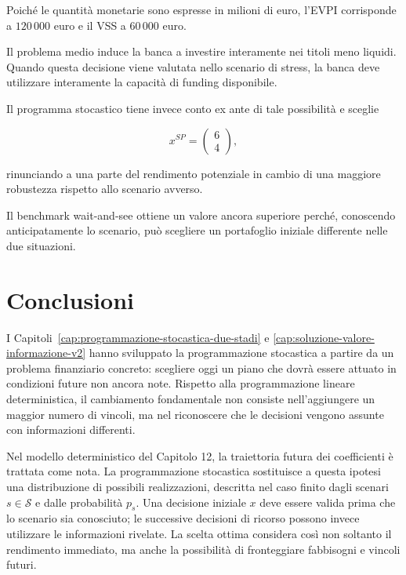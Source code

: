 \begin{enumerate}
Poich\'e le quantit\`a monetarie
sono espresse in milioni di euro,
l'EVPI corrisponde a $120\,000$ euro
e il VSS a $60\,000$ euro.

Il problema medio induce la banca
a investire interamente nei titoli
meno liquidi. Quando questa decisione
viene valutata nello scenario di stress,
la banca deve utilizzare interamente
la capacit\`a di funding disponibile.

Il programma stocastico tiene invece
conto ex ante di tale possibilit\`a
e sceglie

\[
x^{SP}
=
\begin{pmatrix}
6\\
4
\end{pmatrix},
\]

rinunciando a una parte del rendimento
potenziale in cambio di una maggiore
robustezza rispetto allo scenario avverso.

Il benchmark wait-and-see ottiene
un valore ancora superiore perch\'e,
conoscendo anticipatamente lo scenario,
pu\`o scegliere un portafoglio
iniziale differente nelle due situazioni.

\end{enumerate}

\section{Conclusioni}
\label{sec:cap15-conclusioni-v2}

I Capitoli~\ref{cap:programmazione-stocastica-due-stadi} e
\ref{cap:soluzione-valore-informazione-v2} hanno sviluppato la
programmazione stocastica a partire da un problema finanziario
concreto: scegliere oggi un piano che dovr\`a essere attuato in
condizioni future non ancora note. Rispetto alla programmazione
lineare deterministica, il cambiamento fondamentale non consiste
nell'aggiungere un maggior numero di vincoli, ma nel riconoscere
che le decisioni vengono assunte con informazioni differenti.

Nel modello deterministico del Capitolo 12, la traiettoria futura
dei coefficienti \`e trattata come nota. La programmazione stocastica
sostituisce a questa ipotesi una distribuzione di possibili
realizzazioni, descritta nel caso finito dagli scenari $s\in\mathcal S$
e dalle probabilit\`a $p_s$. Una decisione iniziale $x$ deve
essere valida prima che lo scenario sia conosciuto; le successive
decisioni di ricorso possono invece utilizzare le informazioni
rivelate. La scelta ottima considera cos\`i non soltanto il
rendimento immediato, ma anche la possibilit\`a di fronteggiare
fabbisogni e vincoli futuri.

